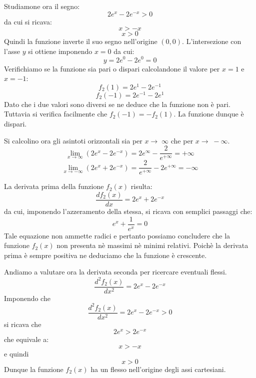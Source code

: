 \documentclass[a4paper,12pt]{article}
\begin{document}
\begin{enumerate}
Studiamone ora il segno:
\begin{equation}2e^x-2e^{-x}>0\end{equation}
 da cui si ricava:
\begin{equation}x>-x\end{equation}
\begin{equation}x>0\end{equation}
Quindi la funzione inverte il suo segno nell'origine $(0,0)$.
L'intersezione con l'asse $y$ si ottiene imponendo $x=0$ da cui:
\begin{equation}y=2e^0-2e^{0}=0\end{equation}
Verifichiamo se la funzione sia pari o dispari calcolandone il valore per $x=1$ e $x=-1$:
\begin{equation}f_2(1)=2e^1-2e^{-1}\end{equation}
\begin{equation}f_2(-1)=2e^{-1}-2e^1\end{equation}
Dato che i due valori sono diversi se ne deduce che la funzione non è pari.
Tuttavia si verifica facilmente che $f_2(-1)=-f_2(1)$. La funzione dunque è dispari.

Si calcolino ora gli asintoti orizzontali sia per $x \rightarrow\;\infty$ che per $x \rightarrow\;-\infty$.
\begin{equation}
  \lim_{x\rightarrow \infty}(2e^x-2e^{-x})=2e^{\infty}-\frac{2}{e^{+\infty}}=+\infty
\end{equation}
\begin{equation}
  \lim_{x\rightarrow- \infty}(2e^x+2e^{-x})=\frac{2}{e^{+\infty}}-2e^{+\infty}=-\infty
\end{equation}

La derivata prima della funzione $f_2(x)$ risulta:
\begin{equation}\frac{df_2(x)}{dx}=2e^x+2e^{-x}\end{equation}
da cui, imponendo l'azzeramento della stessa, si ricava con semplici passaggi che:
\begin{equation}e^x+\frac{1}{e^x}=0\end{equation}
Tale equazione non ammette radici e pertanto possiamo concludere che la funzione $f_2(x)$ non presenta nè massimi nè minimi relativi.
Poichè la derivata prima è sempre positiva ne deduciamo che la funzione è crescente.

Andiamo  a valutare ora la derivata seconda per ricercare eventuali flessi.
\begin{equation}\frac{d^2f_2(x)}{dx^2}=2e^x-2e^{-x}\end{equation}
Imponendo che 
\begin{equation}\frac{d^2f_2(x)}{dx^2}=2e^x-2e^{-x}>0\end{equation}
si ricava che
\begin{equation}2e^x>2e^{-x}\end{equation}
che equivale a:
\begin{equation}x>-x\end{equation}
e quindi
\begin{equation}x>0\end{equation}
Dunque la funzione $f_2(x)$ ha un flesso nell'origine degli assi cartesiani.


\end{enumerate}
\end{document}
